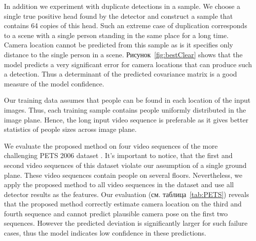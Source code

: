 In addition we experiment with duplicate detections in a sample. We choose a single true positive head found by the detector and construct a sample that contains 64 copies of this head. Such an extreme case of duplication corresponds to a scene with a single person standing in the same place for a long time. Camera location cannot be predicted from this sample as is it specifies only distance to the single person in a scene. Рисунок~\ref{fig:bestClear} shows that the model predicts a very significant error for camera locations that can produce such a detection. Thus a determinant of the predicted covariance matrix is a good measure of the model confidence.

Our training data assumes that people can be found in each location of the input images. Thus, each training sample contains people uniformly distributed in the image plane. Hence, the long input video sequence is preferable as it gives better statistics of people sizes across image plane.

We evaluate the proposed method on four video sequences of the more challenging PETS 2006 dataset \cite{thirde2006overview}. It's important to notice, that the first and second video sequences of this dataset violate our assumption of a single ground plane. These video sequences contain people on several floors. Nevertheless, we apply the proposed method to all video sequences in the dataset and use all detector results as the features. Our evaluation (см. таблица~\ref{tab:PETS}) reveals that the proposed method correctly estimate camera location on the third and fourth sequence and cannot predict plausible camera pose on the first two sequences. However the predicted deviation is significantly larger for such failure cases, thus the model indicates low confidence in these predictions.


